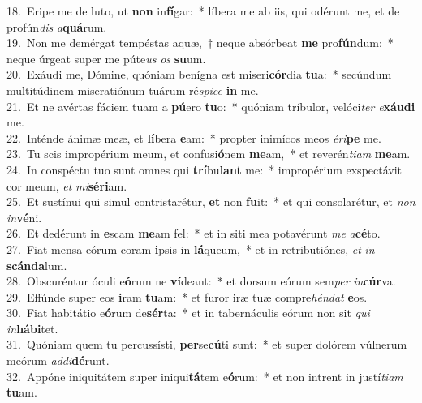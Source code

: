 {18.~}Eripe me de luto, ut \textbf{non} in\textbf{fí}gar:~* líbera me ab iis, qui odérunt me, et de profún\textit{dis} \textit{a}\textbf{quá}rum.\\
{19.~}Non me demérgat tempéstas aquæ,~† neque absórbeat \textbf{me} pro\textbf{fún}dum:~* neque úrgeat super me púte\textit{us} \textit{os} \textbf{su}um.\\
{20.~}Exáudi me, Dómine, quóniam benígna est miseri\textbf{cór}dia \textbf{tu}a:~* secúndum multitúdinem miseratiónum tuárum ré\textit{spi}\textit{ce} \textbf{in} me.\\
{21.~}Et ne avértas fáciem tuam a \textbf{pú}ero \textbf{tu}o:~* quóniam tríbulor, velóci\textit{ter} \textit{e}\textbf{xáu}\textbf{di} me.\\
{22.~}Inténde ánimæ meæ, et \textbf{lí}bera \textbf{e}am:~* propter inimícos meos \textit{é}\textit{ri}\textbf{pe} me.\\
{23.~}Tu scis impropérium meum, et confusi\textbf{ó}nem \textbf{me}am,~* et reverén\textit{ti}\textit{am} \textbf{me}am.\\
{24.~}In conspéctu tuo sunt omnes qui \textbf{trí}bu\textbf{lant} me:~* impropérium exspectávit cor meum, \textit{et} \textit{mi}\textbf{sé}\textbf{ri}am.\\
{25.~}Et sustínui qui simul contristarétur, \textbf{et} non \textbf{fu}it:~* et qui consolarétur, et \textit{non} \textit{in}\textbf{vé}ni.\\
{26.~}Et dedérunt in \textbf{e}scam \textbf{me}am fel:~* et in siti mea potavérunt \textit{me} \textit{a}\textbf{cé}to.\\
{27.~}Fiat mensa eórum coram \textbf{i}psis in \textbf{lá}queum,~* et in retributiónes, \textit{et} \textit{in} \textbf{scán}\textbf{da}lum.\\
{28.~}Obscuréntur óculi e\textbf{ó}rum ne \textbf{ví}deant:~* et dorsum eórum sem\textit{per} \textit{in}\textbf{cúr}va.\\
{29.~}Effúnde super eos \textbf{i}ram \textbf{tu}am:~* et furor iræ tuæ compre\textit{hén}\textit{dat} \textbf{e}os.\\
{30.~}Fiat habitátio e\textbf{ó}rum de\textbf{sér}ta:~* et in tabernáculis eórum non sit \textit{qui} \textit{in}\textbf{há}\textbf{bi}tet.\\
{31.~}Quóniam quem tu percussísti, \textbf{per}se\textbf{cú}ti sunt:~* et super dolórem vúlnerum meórum \textit{ad}\textit{di}\textbf{dé}runt.\\
{32.~}Appóne iniquitátem super iniqui\textbf{tá}tem e\textbf{ó}rum:~* et non intrent in justí\textit{ti}\textit{am} \textbf{tu}am.\\
